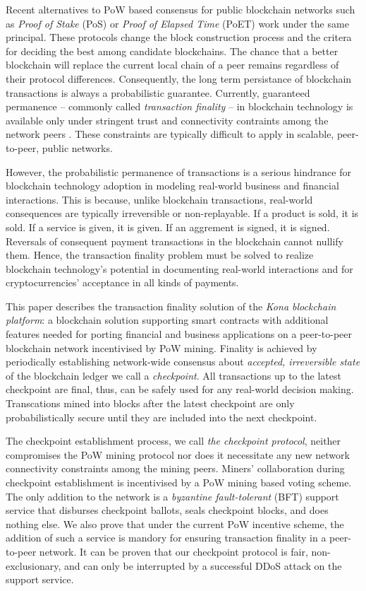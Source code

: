 \documentclass[conference]{IEEEtran}
\begin{document}
Recent alternatives to PoW based consensus for public blockchain networks such as \textit{Proof of Stake} (PoS) \cite{casper} or \textit{Proof of Elapsed Time} (PoET) \cite{poet} work under the same principal. These protocols change the block construction process and the critera for deciding the best among candidate blockchains. The chance that a better blockchain will replace the current local chain of a peer remains regardless of their protocol differences. Consequently, the long term persistance of blockchain transactions is always a probabilistic guarantee. Currently, guaranteed permanence -- commonly called \textit{transaction finality} -- in blockchain technology is available only under stringent trust and connectivity contraints among the network peers \cite{David2014TheRP, Mazières15thestellar}. These constraints are typically difficult to apply in scalable, peer-to-peer, public networks.   

However, the probabilistic permanence of transactions is a serious hindrance for blockchain technology adoption in modeling real-world business and financial interactions. This is because, unlike blockchain transactions, real-world consequences are typically irreversible or non-replayable. If a product is sold, it is sold. If a service is given, it is given. If an aggrement is signed, it is signed. Reversals of consequent payment transactions in the blockchain cannot nullify them. Hence, the transaction finality problem must be solved to realize blockchain technology's potential in documenting real-world interactions and for cryptocurrencies' acceptance in all kinds of payments.

This paper describes the transaction finality solution of the \textit{Kona blockchain platform}: a blockchain solution supporting smart contracts with additional features needed for porting financial and business applications on a peer-to-peer blockchain network incentivised by PoW mining. Finality is achieved by periodically establishing network-wide consensus about \textit{accepted, irreversible state} of the blockchain ledger we call a \textit{checkpoint}. All transactions up to the latest checkpoint are final, thus, can be safely used for any real-world decision making. Transcations mined into blocks after the latest checkpoint are only probabilistically secure until they are included into the next checkpoint.

The checkpoint establishment process, we call \textit{the checkpoint protocol}, neither compromises the PoW mining protocol nor does it necessitate any new network connectivity constraints among the mining peers. Miners' collaboration during checkpoint establishment is incentivised by a PoW mining based voting scheme. The only addition to the network is a \textit{byzantine fault-tolerant} (BFT) \cite{Lamport:1982:BGP:357172.357176} support service that disburses checkpoint ballots, seals checkpoint blocks, and does nothing else. We also prove that under the current PoW incentive scheme, the addition of such a service is mandory for ensuring transaction finality in a peer-to-peer network. It can be proven that our checkpoint protocol is fair, non-exclusionary, and can only be interrupted by a successful DDoS attack \cite{Yu:2013:DDS:2556385} on the support service.          
\end{document}
